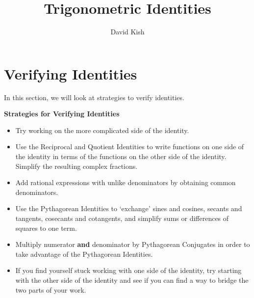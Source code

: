 \documentclass{ximera}
\author{David Kish}
\title{Trigonometric Identities}
\begin{document}
\begin{abstract}
  
\end{abstract}
\maketitle





\section{Verifying Identities}
In this section, we will look at strategies to verify identities.
\begin{remark}
\centerline{\textbf{Strategies for Verifying Identities}} 

\begin{itemize}

\item  Try working on the more complicated side of the identity.

\item Use the Reciprocal and Quotient Identities to write functions on one side of the identity in terms of the functions on the other side of the identity.  Simplify the resulting complex fractions.

\item Add rational expressions with unlike denominators by obtaining common denominators.

\item  Use the Pythagorean Identities to `exchange' sines and cosines, secants and tangents, cosecants and cotangents, and simplify sums or differences of squares to one term. 

\item Multiply numerator \textbf{and} denominator by Pythagorean
Conjugates in order to take advantage of the Pythagorean Identities.

\item If you find yourself stuck working with one side of the identity, try starting with the other side of the identity and see if you can find a way to bridge the two parts of your work.


\end{itemize}
\end{remark}
\end{document}

